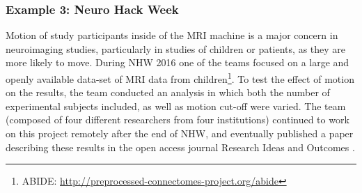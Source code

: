 \subsubsection*{Example 3: Neuro Hack Week}
Motion of study participants inside of the MRI machine is a major concern in neuroimaging studies, particularly in studies of children or patients, as they are more likely to move.
During NHW 2016 one of the teams focused on a large and openly available data-set of MRI data from children\footnote{ABIDE: \url{http://preprocessed-connectomes-project.org/abide}}.
To test the effect of motion on the results, the team conducted an analysis in which both the number of experimental subjects included, as well as motion cut-off were varied.
The team (composed of four different researchers from four institutions) continued to work on this project remotely after the end of NHW, and eventually published a paper describing these results in the open access journal Research Ideas and Outcomes \cite{leonard2017}.
